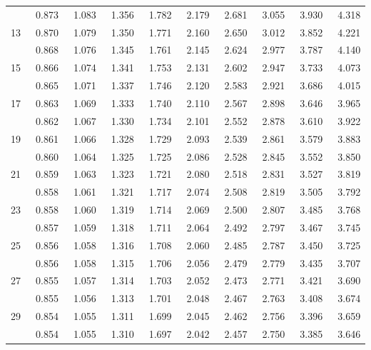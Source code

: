 \begin{center}
\begin{tabular}{r | rrr rr rrrr}
\gray   12	&	~0.873	&	~1.083	&	~1.356	&	~1.782	&	~2.179	&	~2.681	&	~3.055	&	~3.930	&	~4.318	\\
        13	&	~0.870	&	~1.079	&	~1.350	&	~1.771	&	~2.160	&	~2.650	&	~3.012	&	~3.852	&	~4.221	\\
\gray   14	&	~0.868	&	~1.076	&	~1.345	&	~1.761	&	~2.145	&	~2.624	&	~2.977	&	~3.787	&	~4.140	\\
        15	&	~0.866	&	~1.074	&	~1.341	&	~1.753	&	~2.131	&	~2.602	&	~2.947	&	~3.733	&	~4.073	\\
\hline
\gray   16	&	~0.865	&	~1.071	&	~1.337	&	~1.746	&	~2.120	&	~2.583	&	~2.921	&	~3.686	&	~4.015	\\
        17	&	~0.863	&	~1.069	&	~1.333	&	~1.740	&	~2.110	&	~2.567	&	~2.898	&	~3.646	&	~3.965	\\
\gray   18	&	~0.862	&	~1.067	&	~1.330	&	~1.734	&	~2.101	&	~2.552	&	~2.878	&	~3.610	&	~3.922	\\
        19	&	~0.861	&	~1.066	&	~1.328	&	~1.729	&	~2.093	&	~2.539	&	~2.861	&	~3.579	&	~3.883	\\
\gray   20	&	~0.860	&	~1.064	&	~1.325	&	~1.725	&	~2.086	&	~2.528	&	~2.845	&	~3.552	&	~3.850	\\
\hline
\hline
        21	&	~0.859	&	~1.063	&	~1.323	&	~1.721	&	~2.080	&	~2.518	&	~2.831	&	~3.527	&	~3.819	\\
\gray   22	&	~0.858	&	~1.061	&	~1.321	&	~1.717	&	~2.074	&	~2.508	&	~2.819	&	~3.505	&	~3.792	\\
        23	&	~0.858	&	~1.060	&	~1.319	&	~1.714	&	~2.069	&	~2.500	&	~2.807	&	~3.485	&	~3.768	\\
\gray   24	&	~0.857	&	~1.059	&	~1.318	&	~1.711	&	~2.064	&	~2.492	&	~2.797	&	~3.467	&	~3.745	\\
        25	&	~0.856	&	~1.058	&	~1.316	&	~1.708	&	~2.060	&	~2.485	&	~2.787	&	~3.450	&	~3.725	\\
\hline
\gray   26	&	~0.856	&	~1.058	&	~1.315	&	~1.706	&	~2.056	&	~2.479	&	~2.779	&	~3.435	&	~3.707	\\
        27	&	~0.855	&	~1.057	&	~1.314	&	~1.703	&	~2.052	&	~2.473	&	~2.771	&	~3.421	&	~3.690	\\
\gray   28	&	~0.855	&	~1.056	&	~1.313	&	~1.701	&	~2.048	&	~2.467	&	~2.763	&	~3.408	&	~3.674	\\
        29	&	~0.854	&	~1.055	&	~1.311	&	~1.699	&	~2.045	&	~2.462	&	~2.756	&	~3.396	&	~3.659	\\
\gray   30	&	~0.854	&	~1.055	&	~1.310	&	~1.697	&	~2.042	&	~2.457	&	~2.750	&	~3.385	&	~3.646	\\
\hline

\end{tabular}
\end{center}
